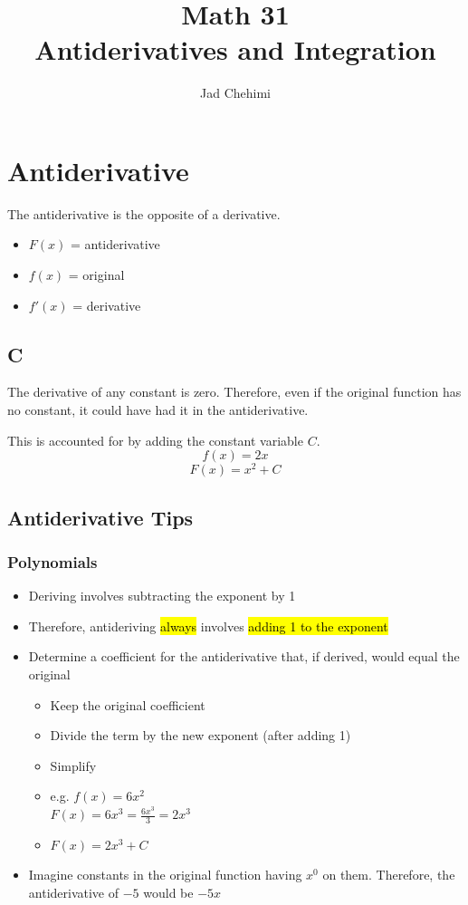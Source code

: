 \documentclass[a4paper,12pt]{article}
\title{Math 31 \\ Antiderivatives and Integration}
\author{Jad Chehimi}
\begin{document}
\maketitle

\tableofcontents

\pagebreak

\section{Antiderivative}
The antiderivative is the opposite of a derivative.

\begin{itemize}
    \item{$F(x)$ = antiderivative}
    \item{$f(x)$ = original}
    \item{$f'(x)$ = derivative}
\end{itemize}

\subsection{C}
The derivative of any constant is zero. Therefore, even if the original function has no constant, it could have had it in the antiderivative.

This is accounted for by adding the constant variable $C$.
$$f(x) = 2x$$
$$F(x) = x^2 + C$$

\subsection{Antiderivative Tips}

\subsubsection{Polynomials}
\begin{itemize}
    \item{Deriving involves subtracting the exponent by 1}
    \item{Therefore, antideriving \hl{always} involves \hl{adding 1 to the exponent}}
    \item{Determine a coefficient for the antiderivative that, if derived, would equal the original
            \begin{itemize}
                \item{Keep the original coefficient}
                \item{Divide the term by the new exponent (after adding 1)}
                \item{Simplify}
                \item{e.g. $f(x) = 6x^2$\\$F(x) = 6x^3 = \frac{6x^3}{3} = 2x^3$}
                \item{$F(x) = 2x^3 + C$}
            \end{itemize}
        }
    \item{Imagine constants in the original function having $x^0$ on them. Therefore, the antiderivative of $-5$ would be $-5x$}
\end{itemize}
\end{document}
